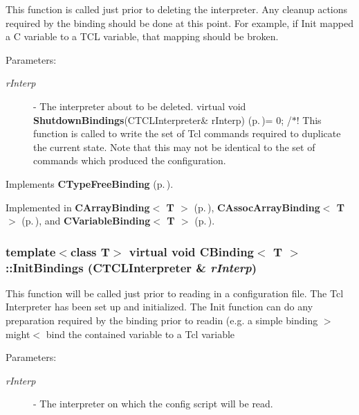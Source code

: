 This function is called just prior to deleting the interpreter. Any cleanup actions required by the binding should be done at this point. For example, if Init mapped a C variable to a TCL variable, that mapping should be broken. \begin{Desc}
\item[Parameters: ]\par
\begin{description}
\item[{\em 
r\-Interp}]- The interpreter about to be deleted. virtual void {\bf Shutdown\-Bindings}(CTCLInterpreter\& r\-Interp) {\rm (p.\,\pageref{classCTypeFreeBinding_a2})}= 0; /$\ast$! This function is called to write the set of Tcl commands required to duplicate the current state. Note that this may not be identical to the set of commands which produced the configuration. \end{description}
\end{Desc}


Implements {\bf CType\-Free\-Binding} {\rm (p.\,\pageref{classCTypeFreeBinding_a3})}.

Implemented in {\bf CArray\-Binding$<$ T $>$} {\rm (p.\,\pageref{classCArrayBinding_a13})}, {\bf CAssoc\-Array\-Binding$<$ T $>$} {\rm (p.\,\pageref{classCAssocArrayBinding_a15})}, and {\bf CVariable\-Binding$<$ T $>$} {\rm (p.\,\pageref{classCVariableBinding_a16})}.
\subsubsection{\setlength{\rightskip}{0pt plus 5cm}template$<$class T$>$ virtual void CBinding$<$ T $>$::Init\-Bindings ({\bf CTCLInterpreter} \& {\em r\-Interp})\hspace{0.3cm}{\tt  [pure virtual]}}\label{classCBinding_a0}


This function will be called just prior to reading in a configuration file. The Tcl Interpreter has been set up and initialized. The Init function can do any preparation required by the binding prior to readin (e.g. a simple binding $>$might$<$ bind the contained variable to a Tcl variable \begin{Desc}
\item[Parameters: ]\par
\begin{description}
\item[{\em 
r\-Interp}]- The interpreter on which the config script will be read. \end{description}
\end{Desc}


